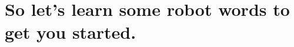 \documentclass[compress]{beamer}
\begin{document}
\section{So let's learn some robot words to get you started.}







\end{document}
